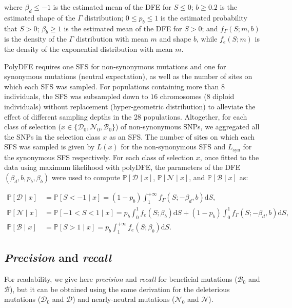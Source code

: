 \documentclass[12pt]{article}
\newcommand{\der}{\text{d}}
\newcommand{\proba}{\mathbb{P}}
\newcommand{\SphyDel}{\mathcal{D}_0}
\newcommand{\SphyNeu}{\mathcal{N}_0}
\newcommand{\SphyBen}{\mathcal{B}_0}
\newcommand{\Sphyclass}{x}
\newcommand{\given}{\mid}
\newcommand{\Spop}{S}
\newcommand{\SpopDel}{\mathcal{D}}
\newcommand{\SpopNeu}{\mathcal{N}}
\newcommand{\SpopBen}{\mathcal{B}}
\newcommand{\AdvMean}{\beta_b}
\newcommand{\DelMean}{\beta_d}
\begin{document}
    where $\DelMean \leq -1 $ is the estimated mean of the DFE for $\Spop \leq 0$;
    $b \geq 0.2$ is the estimated shape of the $\Gamma$ distribution;
    $0 \leq p_b \leq 1$ is the estimated probability that $\Spop > 0$;
    $\AdvMean \geq 1$ is the estimated mean of the DFE for $\Spop > 0$;
    and $f_{\Gamma}(\Spop; m, b)$ is the density of the $\Gamma$ distribution with mean $m$ and shape $b$, while $f_{e}(\Spop; m)$ is the density of the exponential distribution with mean $m$.

    PolyDFE requires one SFS for non-synonymous mutations and one for synonymous mutations (neutral expectation), as well as the number of sites on which each SFS was sampled.
    For populations containing more than $8$ individuals, the SFS was subsampled down to $16$ chromosomes ($8$ diploid individuals) without replacement (hyper-geometric distribution) to alleviate the effect of different sampling depths in the 28 populations.
    Altogether, for each class of selection ($\Sphyclass \in \{\SphyDel, \SphyNeu, \SphyBen \}$) of non-synonymous SNPs, we aggregated all the SNPs in the selection class $\Sphyclass$ as an SFS.
    The number of sites on which each SFS was sampled is given by $L(\Sphyclass)$ for the non-synonymous SFS and $L_{\text{syn}}$ for the synonymous SFS respectively.
    For each class of selection $\Sphyclass$, once fitted to the data using maximum likelihood with polyDFE, the parameters of the DFE $\left( \DelMean , b, p_b, \AdvMean \right)$ were used to compute $\proba [ \SpopDel \given  \Sphyclass] $, $\proba [ \SpopNeu \given \Sphyclass]$, and $\proba [ \SpopBen \given \Sphyclass]$ as:

    \begin{align}
        \proba [ \SpopDel \given  \Sphyclass] &= \proba [ \Spop < -1 \given \Sphyclass ] = \left( 1 - p_b \right) \int_{1}^{+\infty} f_{\Gamma}(\Spop; -\DelMean, b) \der \Spop, \label{eq:polyProbaDel} \\
        \proba [ \SpopNeu \given \Sphyclass] &= \proba [ -1 < \Spop < 1 \given \Sphyclass ] = p_b \int_{0}^{1} f_{e}(\Spop; \AdvMean) \der \Spop + \left( 1 - p_b \right) \int_{0}^{1} f_{\Gamma}(\Spop; -\DelMean, b) \der \Spop, \\
        \proba [ \SpopBen \given \Sphyclass] &= \proba [ \Spop > 1 \given \Sphyclass] = p_b \int_{1}^{+\infty} f_{e}(\Spop; \AdvMean) \der \Spop. \label{eq:polyProbaAdv}
    \end{align}

    \subsection{\textit{Precision} and \textit{recall}}
    \label{subsec:precisison_recall}
    For readability, we give here \textit{precision} and \textit{recall} for beneficial mutations ($\SphyBen$ and $\SpopBen$), but it can be obtained using the same derivation for the deleterious mutations ($\SphyDel$ and $\SpopDel$) and nearly-neutral mutations ($\SphyNeu$ and $\SpopNeu$).
\end{document}
